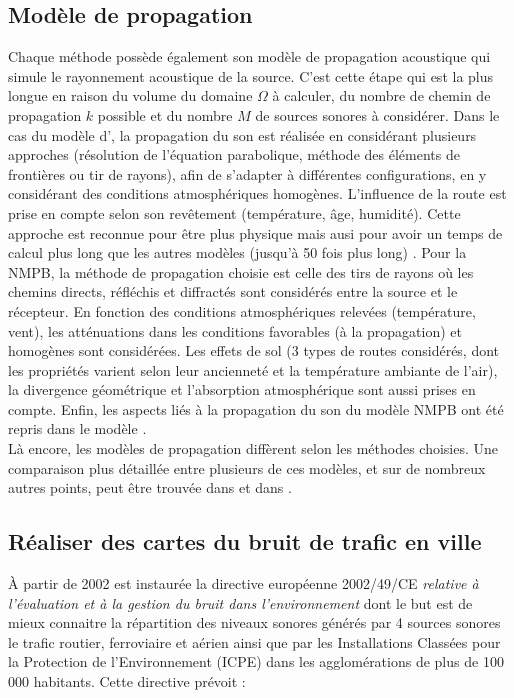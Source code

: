 \subsection{Modèle de propagation}\label{part:modele_propa}
Chaque méthode possède également son modèle de propagation acoustique qui simule le rayonnement acoustique de la source. C'est cette étape qui est la plus longue en raison du volume du domaine $\Omega$ à calculer, du nombre de chemin de propagation $k$ possible et du nombre $M$ de sources sonores à considérer.
Dans le cas du modèle d', la propagation du son est réalisée en considérant plusieurs approches (résolution de l'équation parabolique, méthode des éléments de frontières ou tir de rayons), afin de s'adapter à différentes configurations, en y considérant des conditions atmosphériques homogènes. L'influence de la route est prise en compte selon son revêtement (température, âge, humidité). Cette approche est reconnue pour être plus \og physique \fg{} mais ausi pour avoir un temps de calcul plus long que les autres modèles (jusqu'à 50 fois plus long) \cite{probst2011comparison}. Pour la NMPB, la méthode de propagation choisie est celle des tirs de rayons où les chemins directs, réfléchis et diffractés sont considérés entre la source et le récepteur. En fonction des conditions atmosphériques relevées (température, vent), les atténuations dans les conditions favorables (à la propagation) et homogènes sont considérées. Les effets de sol (3 types de routes considérés, dont les propriétés varient selon leur ancienneté et la température ambiante de l'air), la divergence géométrique et l'absorption atmosphérique sont aussi prises en compte.
Enfin, les aspects liés à la propagation du son du modèle NMPB ont été repris dans le modèle . \\
Là encore, les modèles de propagation diffèrent selon les méthodes choisies. Une comparaison plus détaillée entre plusieurs de ces modèles, et sur de nombreux autres points, peut être trouvée dans \cite{steele_critical_2001} et dans \cite{garg_critical_2014}.

\subsection{Réaliser des cartes du bruit de trafic en ville}

À partir de 2002 est instaurée la directive européenne 2002/49/CE \textit{relative à l'évaluation et à la gestion du bruit dans l'environnement} \cite{directive} dont le but est de mieux connaitre la répartition des niveaux sonores générés par 4 sources sonores le trafic routier, ferroviaire et aérien ainsi que par les Installations Classées pour la Protection de l'Environnement (ICPE) dans les agglomérations de plus de 100 000 habitants. Cette directive prévoit :

